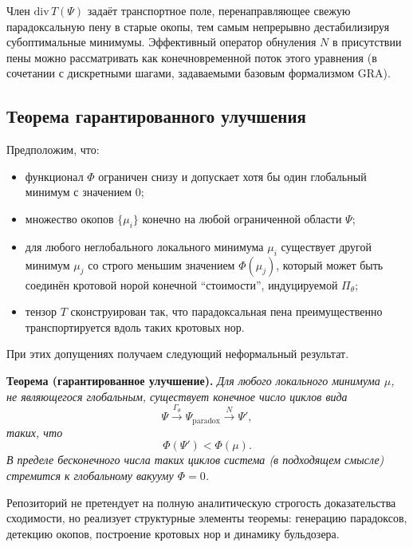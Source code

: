 \documentclass[11pt]{article}
\begin{document}
Член $\mathrm{div}\,T(\Psi)$ задаёт транспортное поле, перенаправляющее свежую парадоксальную пену в старые окопы, тем самым непрерывно дестабилизируя субоптимальные минимумы. 
Эффективный оператор обнуления $N$ в присутствии пены можно рассматривать как конечновременной поток этого уравнения (в сочетании с дискретными шагами, задаваемыми базовым формализмом GRA).

\subsection*{Теорема гарантированного улучшения}

Предположим, что:
\begin{itemize}
    \item[(i)] функционал $\Phi$ ограничен снизу и допускает хотя бы один глобальный минимум с значением $0$;
    \item[(ii)] множество окопов $\{\mu_i\}$ конечно на любой ограниченной области $\Psi$;
    \item[(iii)] для любого неглобального локального минимума $\mu_i$ существует другой минимум $\mu_j$ со строго меньшим значением $\Phi(\mu_j)$, который может быть соединён кротовой норой конечной ``стоимости'', индуцируемой $\Pi_{\theta}$;
    \item[(iv)] тензор $T$ сконструирован так, что парадоксальная пена преимущественно транспортируется вдоль таких кротовых нор.
\end{itemize}

При этих допущениях получаем следующий неформальный результат.

\medskip
\noindent\textbf{Теорема (гарантированное улучшение).}
\emph{Для любого локального минимума $\mu$, не являющегося глобальным, существует конечное число циклов вида}
\begin{equation}
    \Psi \xrightarrow{\Gamma_{\theta}} \Psi_{\text{paradox}} 
    \xrightarrow{N} \Psi',
\end{equation}
\emph{таких, что}
\begin{equation}
    \Phi(\Psi') < \Phi(\mu).
\end{equation}
\emph{В пределе бесконечного числа таких циклов система (в подходящем смысле) стремится к глобальному вакууму $\Phi = 0$.}

\medskip

Репозиторий не претендует на полную аналитическую строгость доказательства сходимости, но реализует структурные элементы теоремы: генерацию парадоксов, детекцию окопов, построение кротовых нор и динамику бульдозера.
\end{document}
